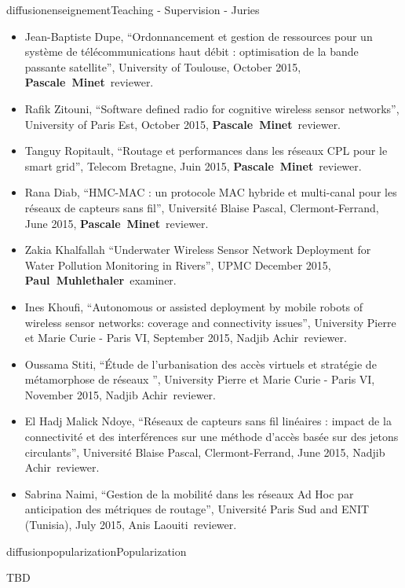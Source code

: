 \documentclass{ra2016}
\newcommand{\paul}  {\textbf{Paul~Muhlethaler}}
\newcommand{\pascale} {\textbf{Pascale~Minet}}
\begin{document}
\begin{module}{diffusion}{enseignement}{Teaching - Supervision - Juries}
\begin{itemize}
\begin{itemize}
            \item Jean-Baptiste Dupe, ``Ordonnancement et gestion de ressources pour un syst\`eme de t\'el\'ecommunications haut d\'ebit : optimisation de la bande passante satellite'', University of Toulouse, October 2015, \pascale~reviewer.
            \item Rafik Zitouni, ``Software defined radio for cognitive wireless sensor networks'', University of Paris Est, October 2015, \pascale~reviewer.
            \item Tanguy Ropitault, ``Routage et performances dans les r\'eseaux CPL pour le smart grid'', Telecom Bretagne, Juin 2015, \pascale~reviewer.
            \item Rana Diab, ``HMC-MAC : un protocole MAC hybride et multi-canal pour les r\'eseaux de capteurs sans fil'', Universit\'e Blaise Pascal,  Clermont-Ferrand, June 2015, \pascale~reviewer.      
            \item Zakia Khalfallah  ``Underwater Wireless Sensor Network Deployment for Water Pollution Monitoring in Rivers'',  UPMC December 2015, \paul~examiner.
            \item  Ines Khoufi, ``Autonomous or assisted deployment by mobile robots of wireless sensor networks: coverage and connectivity issues'', University Pierre et Marie Curie - Paris VI, September 2015, Nadjib Achir~reviewer. 
            \item  Oussama Stiti, ``Étude de l'urbanisation des accès virtuels et stratégie de métamorphose de réseaux '', University Pierre et Marie Curie - Paris VI, November 2015, Nadjib Achir~reviewer. 
            \item  El Hadj Malick Ndoye, ``Réseaux de capteurs sans fil linéaires : impact de la connectivité et des interférences sur une méthode d'accès basée sur des jetons circulants'', Universit\'e Blaise Pascal,  Clermont-Ferrand, June 2015, Nadjib Achir~reviewer.
            \item  Sabrina Naimi, ``Gestion de la mobilité dans les réseaux Ad Hoc par anticipation des métriques de routage'', Université Paris Sud and ENIT (Tunisia), July 2015, Anis Laouiti~reviewer.
        \end{itemize}
\end{itemize}



\end{module}

\begin{module}{diffusion}{popularization}{Popularization}

TBD 


\end{module}
\end{document}
